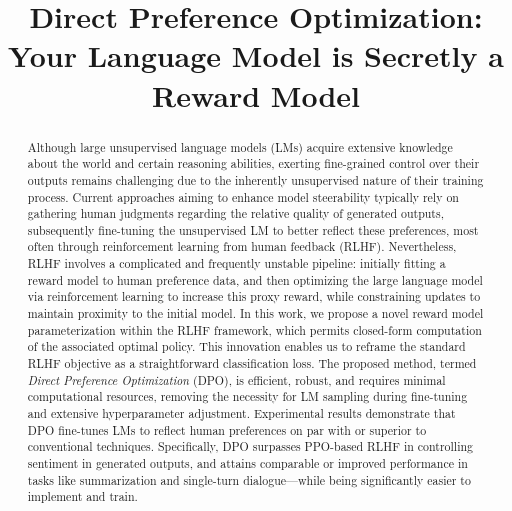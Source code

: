 \title{Direct Preference Optimization: Your Language Model is Secretly a Reward Model}

\begin{abstract}
Although large unsupervised language models (LMs) acquire extensive knowledge about the world and certain reasoning abilities, exerting fine-grained control over their outputs remains challenging due to the inherently unsupervised nature of their training process. Current approaches aiming to enhance model steerability typically rely on gathering human judgments regarding the relative quality of generated outputs, subsequently fine-tuning the unsupervised LM to better reflect these preferences, most often through reinforcement learning from human feedback (RLHF). Nevertheless, RLHF involves a complicated and frequently unstable pipeline: initially fitting a reward model to human preference data, and then optimizing the large language model via reinforcement learning to increase this proxy reward, while constraining updates to maintain proximity to the initial model. In this work, we propose a novel reward model parameterization within the RLHF framework, which permits closed-form computation of the associated optimal policy. This innovation enables us to reframe the standard RLHF objective as a straightforward classification loss. The proposed method, termed \textit{Direct Preference Optimization} (DPO), is efficient, robust, and requires minimal computational resources, removing the necessity for LM sampling during fine-tuning and extensive hyperparameter adjustment. Experimental results demonstrate that DPO fine-tunes LMs to reflect human preferences on par with or superior to conventional techniques. Specifically, DPO surpasses PPO-based RLHF in controlling sentiment in generated outputs, and attains comparable or improved performance in tasks like summarization and single-turn dialogue—while being significantly easier to implement and train.
\end{abstract}

